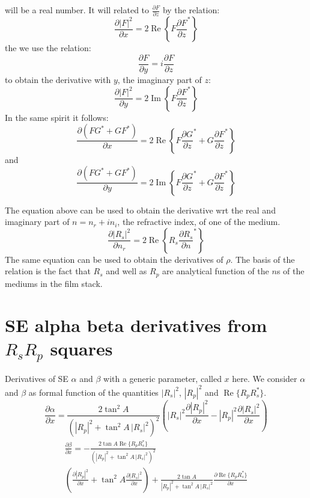 \documentclass{article}
\begin{document}
will be a real number. It will related to $\frac{\partial F}{\partial z}$ by the relation:
\begin{equation}
    \frac{\partial |F|^2}{\partial x} = 2 \operatorname{Re}\left\{F \frac{\partial F}{\partial z}^\ast\right\}
\end{equation}
the we use the relation:
\begin{equation*}
    \frac{\partial F}{\partial y} = i \frac{\partial F}{\partial z}
\end{equation*}
to obtain the derivative with $y$, the imaginary part of $z$:
\begin{equation}
    \frac{\partial |F|^2}{\partial y} = 2 \operatorname{Im}\left\{F \frac{\partial F}{\partial z}^\ast\right\}
\end{equation}
In the same spirit it follows:
\begin{equation}
    \frac{\partial \left( F G^\ast+G F^\ast \right)}{\partial x} = 2 \operatorname{Re}\left\{F \frac{\partial G}{\partial z}^\ast + G \frac{\partial F}{\partial z}^\ast\right\}
\end{equation}
and
\begin{equation}
    \frac{\partial \left( F G^\ast+G F^\ast\right)}{\partial y} = 2 \operatorname{Im}\left\{F \frac{\partial G}{\partial z}^\ast + G \frac{\partial F}{\partial z}^\ast\right\}
\end{equation}

The equation above can be used to obtain the derivative wrt the real and imaginary part of $n = n_r + i n_i$, the refractive index, of one of the medium.
\begin{equation*}
    \frac{\partial |R_s|^2}{\partial n_r} = 2 \operatorname{Re}\left\{R_s \frac{\partial R_s}{\partial n}^\ast\right\}
\end{equation*}
The same equation can be used to obtain the derivatives of $\rho$. The basis of the relation is the fact that $R_s$ and well as $R_p$ are analytical function of the $n$s of the mediums in the film stack.

\section{SE alpha beta derivatives from $R_s R_p$ squares}
Derivatives of SE $\alpha$ and $\beta$ with a generic parameter, called $x$ here. We consider $\alpha$ and $\beta$ as formal function of the quantities $|R_s|^2$, $|R_p|^2$ and $\operatorname{Re}\{R_p R_s^\ast\}$.
\begin{equation}
\frac{\partial \alpha}{\partial x} = \frac{2 \tan^2 A}{\left( |R_p|^2 + \tan^2 A \, |R_s|^2 \right)^2} \left( |R_s|^2 \frac{\partial |R_p|^2}{\partial x} - |R_p|^2 \frac{\partial |R_s|^2}{\partial x}\right)
\end{equation}
\begin{multline}
\frac{\partial \beta}{\partial x} = - \frac{2 \tan A \operatorname{Re}\{R_p R_s^\ast\}}{\left( |R_p|^2 + \tan^2 A \, |R_s|^2 \right)^2} \\ \left( \frac{\partial |R_p|^2}{\partial x} +  \tan^2 A \frac{\partial |R_s|^2}{\partial x}\right) + \frac{2 \tan A}{|R_p|^2 + \tan^2 A \, |R_s|^2} \frac{\partial \operatorname{Re}\{R_p R_s^\ast\}}{\partial x}
\end{multline}
\end{document}
